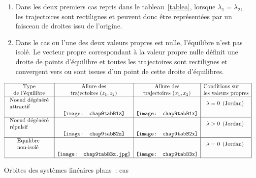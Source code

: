 \begin{remarques}{\hspace{1cm}}\end{remarques}
\begin{enumerate}
\item Dans les deux premiers cas repris dans le tableau~\ref{tablea}, lorsque
$\lambda_1=\lambda_2$, les trajectoires sont rectilignes et peuvent donc
{ê}tre repr{é}sent{é}es par un faisceau de droites issu de l'origine.
\item Dans le cas ou l'une des deux valeurs propres est nulle, l'{é}quilibre
n'est pas isol{é}. Le vecteur propre correspondant {à} la valeur propre
nulle d{é}finit une droite de points d'{é}quilibre et toutes les
trajectoires sont rectilignes et convergent vers ou sont issues d'un point
de cette droite d'{é}quilibres.
\end{enumerate}
\begin{table}
\begin{eqnarray*}
\begin{array}{|c|c|c|l|}
\hline
\mbox{Type}&\mbox{Allure des}& \mbox{Allure des} &\mbox{Conditions sur}\\
\mbox{de l'{é}quilibre}&\mbox{trajectoires }(z_1,z_2)&\mbox{trajectoires }(x_1,x_2)&\mbox{les valeurs propres}\\
\hline
\begin{array}{l}
\mbox{Noeud d{é}g{é}n{é}r{é}}\\
\mbox{attractif}\end{array} & & &\begin{array}{l} \lambda = 0\\  \end{array} \mbox{(Jordan)} \\
&\mbox{\texttt{[image: chap9tabB1z]}}&\mbox{\texttt{[image: chap9tabB1x]}} &\\
\hline
\begin{array}{l}
\mbox{Noeud d{é}g{é}n{é}r{é}}\\   
\mbox{répulsif}\end{array} & & & \begin{array}{l}\lambda >0 \\
\end{array}\mbox{(Jordan)}\\
&\mbox{\texttt{[image: chap9tabB2z]}}&\mbox{\texttt{[image: chap9tabB2x]}} &\\
\hline
\begin{array}{l}
\mbox{Equilibre }\\   
\mbox{non-isolé}\end{array} & & & \begin{array}{l}\lambda=0\\
\end{array}\mbox{(Jordan)}\\
&\mbox{\texttt{[image: chap9tabB3z.jpg]}}&\mbox{\texttt{[image: chap9tabB3x]}} &\\
\hline
\end{array}
\end{eqnarray*}
\caption{Orbites des systèmes linéaires plans~: cas}
\label{tableb}
\end{table}
